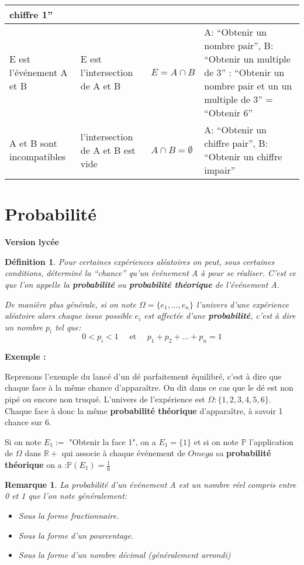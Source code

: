 \documentclass[a4paper]{report}
\theoremstyle{break}
\newtheorem{mydef}{Définition}[chapter]
\newtheorem*{Rem}{Remarque}
\newcommand{\R}{\mathbb{R}}
\newcounter{exem}
\newcommand{\exemple}[1]{\textbf{Exemple \theexem: #1} \addtocounter{exem}{1} }
\begin{document}
\begin{table}[h!]
\begin{tabular}{|L{5cm}|L{5cm}|L{1.5cm}|L{5cm}|}
                                    chiffre 1'' \\
  \hline
  E est l'événement A et B & E est l'intersection de A et B & $E = A \cap B$
                           &  A: ``Obtenir un nombre pair'', B: ``Obtenir un multiple de 3''
                             \color{red}{E}: ``Obtenir un nombre pair et un
                             un multiple de 3'' = ``Obtenir 6'' \\
  \hline
  A et B sont incompatibles & l'intersection de A et B est vide & $A \cap B =
                                                                  \emptyset$
                            & A: ``Obtenir un chiffre pair'', B: ``Obtenir un
                              chiffre impair''\\
  \hline
\end{tabular}
\end{table}

\section{Probabilité}
\textbf{Version lycée}
\begin{mydef}
  Pour certaines expériences aléatoires on peut, sous certaines conditions,
  déterminé la ``chance'' qu'un événement A à pour se réaliser. C'est ce que l'on
  appelle la \textbf{probabilité} ou \textbf{probabilité théorique} de
  l'événement A.

  De manière plus générale, si on note $\Omega = \{e_1, \dots, e_n\}$ l'univers
  d'une expérience aléatoire alors chaque issue possible $e_i$ est affectée
  d'une \textbf{probabilité}, c'est à dire un nombre $p_i$ tel que:
  \[
    0 < p_i < 1 \quad \text{ et } \quad p_1 + p_2 + \dots + p_n = 1
  \]
\end{mydef}

\exemple{}

Reprenons l'exemple du lancé d'un dé parfaitement équilibré, c'est à dire que
chaque face à la même chance d'apparaître. On dit dans ce cas que le dé est non
pipé ou encore non truqué. L'univers de l'expérience est $\Omega: \{1, 2, 3, 4,
5, 6\}$. Chaque face à donc la même \textbf{probabilité théorique}
d'apparaître, à savoir 1 chance sur 6.

Si on note $E_1 :=$ "Obtenir la face 1", on a $E_1=\{1\}$ et si on note
$\mathbb{P}$ l'application de $\Omega$ dans $\R+$ qui associe à chaque événement
de $Omega$ sa \textbf{probabilité théorique} on a :$\mathbb{P}(E_1) =
\frac{1}{6} $

\begin{Rem}
  La probabilité d'un événement A est un nombre réel compris entre 0 et 1 que
  l'on note généralement:
  \begin{itemize}
  \item Sous la forme fractionnaire.
  \item Sous la forme d'un pourcentage.
  \item Sous la forme d'un nombre décimal (généralement arrondi)
  \end{itemize}
\end{Rem}
\end{document}
